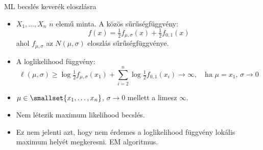 \documentclass[aspectratio=169,notheorems,9pt,\option]{beamer}
\begin{document}
  \begin{frame}{ML becslés keverék eloszlásra}
    \begin{itemize}
      \item $X_1,\dots,X_n$ $n$ elemű minta. A közös sűrűségfüggvény:
      \begin{displaymath}
        f(x)=\tfrac12 f_{\mu,\sigma}(x)+\tfrac12 f_{0,1}(x)
      \end{displaymath}
      ahol $f_{\mu,\sigma}$ az $N(\mu,\sigma)$ eloszlás sűrűségfüggvénye.
      \item A loglikelihood függvény:
      \begin{displaymath}
        \ell(\mu,\sigma) \geq \log \tfrac12 f_{\mu,\sigma}(x_1)+\sum_{i=2}^n \log\tfrac12f_{0,1}(x_i)\to\infty,
        \quad\text{ha $\mu=x_1$, $\sigma\to0$}
      \end{displaymath}
      \item $\mu\in\smallset{x_1,\dots,x_n}$, $\sigma\to0$ mellett a limesz $\infty$.
      \item Nem létezik maximum likelihood becslés.
      \item Ez nem jelenti azt, hogy nem érdemes  a loglikelihood függvény lokális maximum helyét megkeresni. 
      EM algoritmus.
    \end{itemize}
  \end{frame}
  
\end{document}

